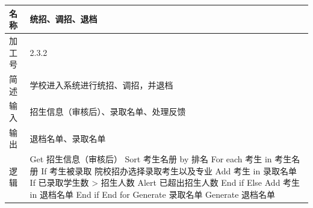\documentclass[CJK,utf8]{ctexrep}
\begin{document}
\begin{tabularx}{0.85\textwidth}{|l|X|}
	\hline
	\textbf{名称} & \textbf{统招、调招、退档} \\
	\hline
	加工号 & 2.3.2 \\
	\hline
	简述 & 学校进入系统进行统招、调招，并退档 \\
	\hline
	输入 & 招生信息（审核后）、录取名单、处理反馈 \\
	\hline
	输出 & 退档名单、录取名单 \\
	\hline
	\multirow{15}{*}{逻辑} & \ttfamily
	Get 招生信息（审核后） \newline
	Sort 考生名册 by 排名 \newline
	For each 考生 in 考生名册 \newline
	\hspace*{0.6cm}If 考生被录取 \newline
	\hspace*{1.2cm}院校招办选择录取考生以及专业 \newline
	\hspace*{1.2cm}Add 考生 in 录取名单 \newline
	\hspace*{1.2cm}If 已录取学生数 > 招生人数 \newline
	\hspace*{1.8cm}Alert 已超出招生人数 \newline
	\hspace*{1.2cm}End if \newline
	\hspace*{0.6cm}Else \newline
	\hspace*{1.2cm}Add 考生 in 退档名单 \newline
	\hspace*{0.6cm}End if \newline
	End for \newline
	Generate 录取名单 \newline
	Generate 退档名单 \\
	\hline
\end{tabularx}
\end{document}
